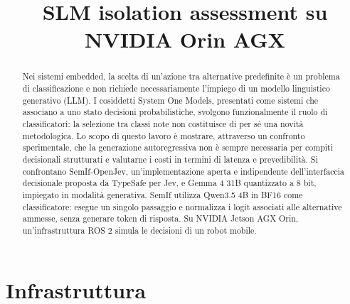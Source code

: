 \documentclass[conference]{IEEEtran}
\begin{document}
\raggedbottom
\title{SLM isolation assessment su NVIDIA Orin AGX}
\author{
\and{}
}
\maketitle
\begin{abstract}
Nei sistemi embedded, la scelta di un'azione tra alternative predefinite è un problema di classificazione e non richiede necessariamente l'impiego di un modello linguistico generativo (LLM). I cosiddetti System One Models, presentati come sistemi che associano a uno stato decisioni probabilistiche, svolgono funzionalmente il ruolo di classificatori: la selezione tra classi note non costituisce di per sé una novità metodologica. Lo scopo di questo lavoro è mostrare, attraverso un confronto sperimentale, che la generazione autoregressiva non è sempre necessaria per compiti decisionali strutturati e valutarne i costi in termini di latenza e prevedibilità. Si confrontano SemIf-OpenJev, un'implementazione aperta e indipendente dell'interfaccia decisionale proposta da TypeSafe per Jev, e Gemma 4 31B quantizzato a 8 bit, impiegato in modalità generativa. SemIf utilizza Qwen3.5 4B in BF16 come classificatore: esegue un singolo passaggio e normalizza i logit associati alle alternative ammesse, senza generare token di risposta. Su NVIDIA Jetson AGX Orin, un'infrastruttura ROS 2 simula le decisioni di un robot mobile.
\end{abstract}



\section{Infrastruttura}\label{sec:infra}
\end{document}
